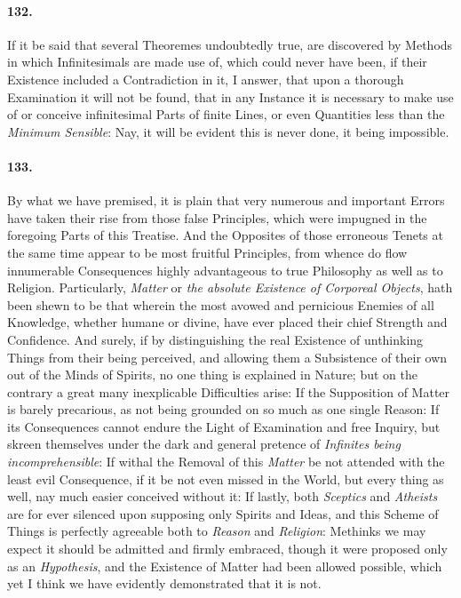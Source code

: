 \documentclass[]{article}
\newenvironment{sectionbody}{\begin{multicols}{2}}{\end{multicols}}
\begin{document}
\begin{sectionbody}
\paragraph{132.} If it be said that several Theoremes undoubtedly true, are
discovered by Methods in which Infinitesimals are made use of,
which could never have been, if their Existence included a
Contradiction in it, I answer, that upon a thorough Examination
it will not be found, that in any Instance it is necessary to
make use of or conceive infinitesimal Parts of finite Lines, or
even Quantities less than the \emph{Minimum Sensible}: Nay, it
will be evident this is never done, it being impossible.



\paragraph{133.} By what we have premised, it is plain that very numerous and
important Errors have taken their rise from those false
Principles, which were impugned in the foregoing Parts of this
Treatise.  And the Opposites of those erroneous Tenets at the
same time appear to be most fruitful Principles, from whence do
flow innumerable Consequences highly advantageous to true
Philosophy as well as to Religion.  Particularly, \emph{Matter}
or \emph{the absolute Existence of Corporeal Objects}, hath been
shewn to be that wherein the most avowed and pernicious Enemies
of all Knowledge, whether humane or divine, have ever placed
their chief Strength and Confidence.  And surely, if by
distinguishing the real Existence of unthinking Things from their
being perceived, and allowing them a Subsistence of their own out
of the Minds of Spirits, no one thing is explained in Nature; but
on the contrary a great many inexplicable Difficulties arise: If
the Supposition of Matter is barely precarious, as not being
grounded on so much as one single Reason: If its Consequences
cannot endure the Light of Examination and free Inquiry, but
skreen themselves under the dark and general pretence of
\emph{Infinites being incomprehensible}: If withal the Removal
of this \emph{Matter} be not attended with the least evil
Consequence, if it be not even missed in the World, but every
thing as well, nay much easier conceived without it: If lastly,
both \emph{Sceptics} and \emph{Atheists} are for ever silenced
upon supposing only Spirits and Ideas, and this Scheme of Things
is perfectly agreeable both to \emph{Reason} and
\emph{Religion}: Methinks we may expect it should be admitted
and firmly embraced, though it were proposed only as an
\emph{Hypothesis}, and the Existence of Matter had been allowed
possible, which yet I think we have evidently demonstrated that
it is not.




\end{sectionbody}
\end{document}

